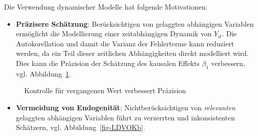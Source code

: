 \documentclass[
  a4paper,
  DIV=11,
  oneside]{scrreprt}
\providecommand{\tightlist}{%
  \setlength{\itemsep}{0pt}\setlength{\parskip}{0pt}}\usepackage{longtable,booktabs,array}
\begin{document}
Die Verwendung dynamischer Modelle hat folgende Motivationen:

\begin{itemize}
\tightlist
\item
  \textbf{Präzisere Schätzung}: Berücksichtigen von gelaggten abhängigen
  Variablen ermöglicht die Modellierung einer zeitabhängigen Dynamik von
  \(Y_{it}\). Die Autokorellation und damit die Varianz der Fehlerterme
  kann reduziert werden, da ein Teil dieser zeitlichen Abhängigkeiten
  direkt modelliert wird. Dies kann die Präzision der Schätzung des
  kausalen Effekts \(\beta_1\) verbessern, vgl.
  Abbildung~\ref{fig-LDVOKa}.
\end{itemize}

\begin{figure}[t]


\caption{\label{fig-LDVOKa}Kontrolle für vergangenen Wert verbessert
Präzision}

\end{figure}%

\begin{itemize}
\tightlist
\item
  \textbf{Vermeidung von Endogenität}: Nichtberücksichtigen von
  \emph{relevanten} gelaggten abhängigen Variablen führt zu verzerrten
  und inkonsistenten Schätzern, vgl. Abbildung~\ref{fig-LDVOKb}.
\end{itemize}
\end{document}

